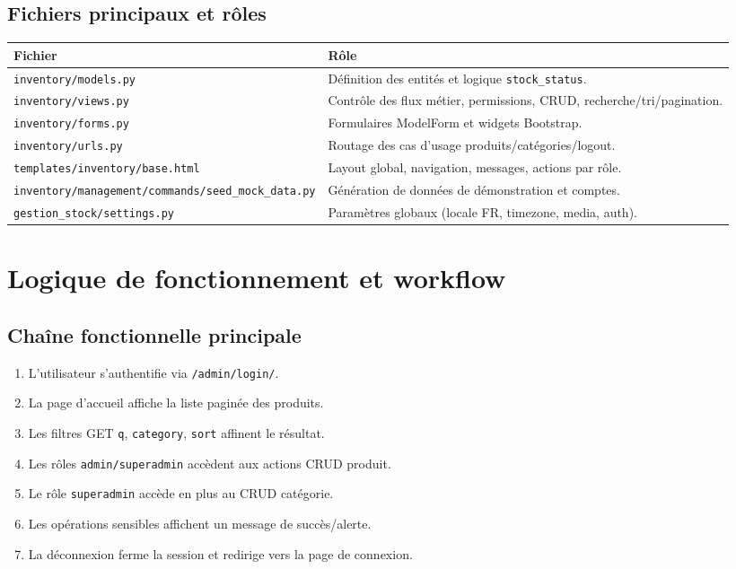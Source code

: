 \documentclass[11pt,a4paper]{article}
\begin{document}
\subsection{Fichiers principaux et r\^oles}
\begin{longtable}{p{5.2cm}p{9.2cm}}
\toprule
\textbf{Fichier} & \textbf{R\^ole} \\
\midrule
\texttt{inventory/models.py} & D\'efinition des entit\'es et logique \texttt{stock\_status}. \\
\texttt{inventory/views.py} & Contr\^ole des flux m\'etier, permissions, CRUD, recherche/tri/pagination. \\
\texttt{inventory/forms.py} & Formulaires ModelForm et widgets Bootstrap. \\
\texttt{inventory/urls.py} & Routage des cas d'usage produits/cat\'egories/logout. \\
\texttt{templates/inventory/base.html} & Layout global, navigation, messages, actions par r\^ole. \\
\texttt{inventory/management/commands/seed\_mock\_data.py} & G\'en\'eration de donn\'ees de d\'emonstration et comptes. \\
\texttt{gestion\_stock/settings.py} & Param\`etres globaux (locale FR, timezone, media, auth). \\
\bottomrule
\end{longtable}

\section{Logique de fonctionnement et workflow}
\subsection{Cha\^ine fonctionnelle principale}
\begin{enumerate}[leftmargin=1.2cm]
  \item L'utilisateur s'authentifie via \texttt{/admin/login/}.
  \item La page d'accueil affiche la liste pagin\'ee des produits.
  \item Les filtres GET \texttt{q}, \texttt{category}, \texttt{sort} affinent le r\'esultat.
  \item Les r\^oles \texttt{admin/superadmin} acc\`edent aux actions CRUD produit.
  \item Le r\^ole \texttt{superadmin} acc\`ede en plus au CRUD cat\'egorie.
  \item Les op\'erations sensibles affichent un message de succ\`es/alerte.
  \item La d\'econnexion ferme la session et redirige vers la page de connexion.
\end{enumerate}
\end{document}
